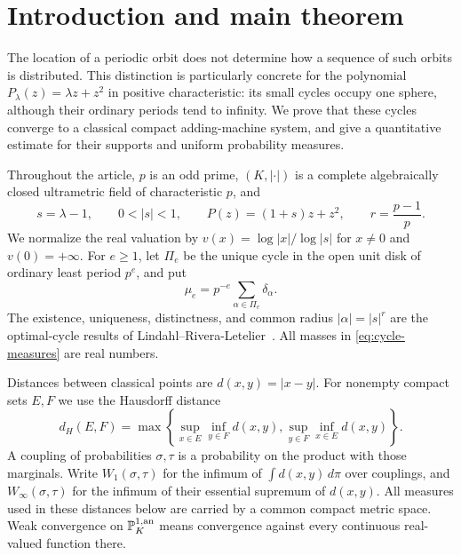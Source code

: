 \section{Introduction and main theorem}
\label{sec:introduction}

The location of a periodic orbit does not determine how a sequence of
such orbits is distributed. This distinction is particularly concrete
for the polynomial $P_\lambda(z)=\lambda z+z^2$ in positive
characteristic: its small cycles occupy one sphere, although their
ordinary periods tend to infinity. We prove that these cycles converge
to a classical compact adding-machine system, and give a quantitative
estimate for their supports and uniform probability measures.

Throughout the article, $p$ is an odd prime, $(K,|\cdot|)$ is a
complete algebraically closed ultrametric field of characteristic $p$,
and
\begin{equation}\label{eq:setup}
  s=\lambda-1,\qquad 0<|s|<1,\qquad
  P(z)=(1+s)z+z^2,\qquad r=\frac{p-1}{p}.
\end{equation}
We normalize the real valuation by
$v(x)=\log|x|/\log|s|$ for $x\ne0$ and $v(0)=+\infty$.
For $e\ge1$, let $\Pi_e$ be the unique cycle in the open unit disk
of ordinary least period $p^e$, and put
\begin{equation}\label{eq:cycle-measures}
  \mu_e=p^{-e}\sum_{\alpha\in\Pi_e}\delta_\alpha.
\end{equation}
The existence, uniqueness, distinctness, and common radius
$|\alpha|=|s|^r$ are the optimal-cycle results of
Lindahl--Rivera-Letelier~\cite[Theorem C and the $q=1$ discussion]{lindahl2016optimal}.
All masses in \eqref{eq:cycle-measures} are real numbers.

Distances between classical points are $d(x,y)=|x-y|$. For nonempty
compact sets $E,F$ we use the Hausdorff distance
\[
 d_H(E,F)=\max\left\{\sup_{x\in E}\inf_{y\in F}d(x,y),
                         \sup_{y\in F}\inf_{x\in E}d(x,y)\right\}.
\]
A coupling of probabilities $\sigma,\tau$ is a probability on the
product with those marginals. Write $W_1(\sigma,\tau)$ for the
infimum of $\int d(x,y)\,d\pi$ over couplings, and
$W_\infty(\sigma,\tau)$ for the infimum of their essential supremum
of $d(x,y)$. All measures used in these distances below are carried
by a common compact metric space. Weak convergence on $\mathbb P^{1,\mathrm{an}}_K$ means
convergence against every continuous real-valued function there.

